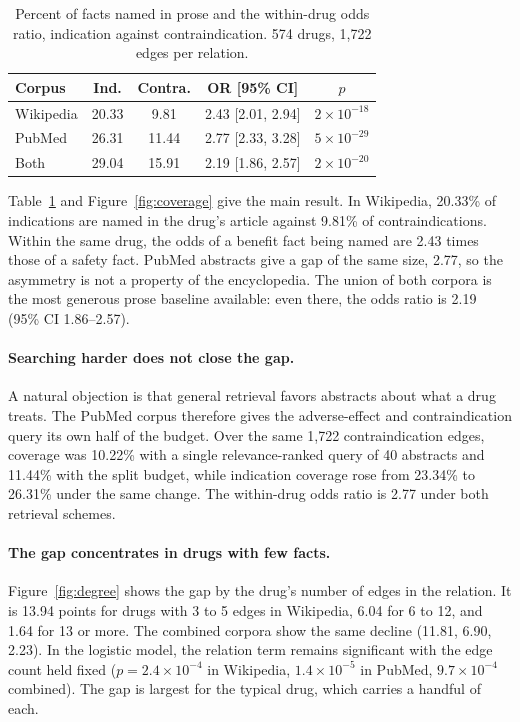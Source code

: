 \documentclass[letterpaper]{article} %
\begin{document}
\begin{table}[t]
\centering
\small
\setlength{\tabcolsep}{4pt}
\begin{tabular}{lcccc}
\toprule
Corpus & Ind. & Contra. & OR [95\% CI] & $p$ \\
\midrule
Wikipedia & 20.33 & 9.81 & 2.43 [2.01, 2.94] & $2\times10^{-18}$ \\
PubMed & 26.31 & 11.44 & 2.77 [2.33, 3.28] & $5\times10^{-29}$ \\
Both & 29.04 & 15.91 & 2.19 [1.86, 2.57] & $2\times10^{-20}$ \\
\bottomrule
\end{tabular}
\caption{Percent of facts named in prose and the within-drug odds ratio,
indication against contraindication. 574 drugs, 1,722 edges per relation.}
\label{tab:coverage}
\end{table}

Table~\ref{tab:coverage} and Figure~\ref{fig:coverage} give the main result.
In Wikipedia, 20.33\% of indications are named in the drug's article against
9.81\% of contraindications. Within the same drug, the odds of a benefit fact
being named are 2.43 times those of a safety fact. PubMed abstracts give a gap
of the same size, 2.77, so the asymmetry is not a property of the encyclopedia.
The union of both corpora is the most generous prose baseline available: even
there, the odds ratio is 2.19 (95\% CI 1.86--2.57).

\paragraph{Searching harder does not close the gap.}
A natural objection is that general retrieval favors abstracts about what a
drug treats. The PubMed corpus therefore gives the adverse-effect and
contraindication query its own half of the budget. Over the same 1,722
contraindication edges, coverage was 10.22\% with a single relevance-ranked
query of 40 abstracts and 11.44\% with the split budget, while indication
coverage rose from 23.34\% to 26.31\% under the same change. The within-drug
odds ratio is 2.77 under both retrieval schemes.

\paragraph{The gap concentrates in drugs with few facts.}
Figure~\ref{fig:degree} shows the gap by the drug's number of edges in the
relation. It is 13.94 points for drugs with 3 to 5 edges in Wikipedia, 6.04
for 6 to 12, and 1.64 for 13 or more. The combined corpora show the same
decline (11.81, 6.90, 2.23). In the logistic model, the relation term remains
significant with the edge count held fixed ($p = 2.4\times10^{-4}$ in
Wikipedia, $1.4\times10^{-5}$ in PubMed, $9.7\times10^{-4}$ combined). The gap
is largest for the typical drug, which carries a handful of each.
\end{document}
